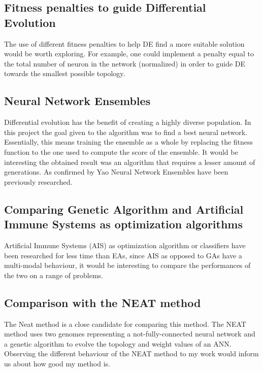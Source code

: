 \documentclass[a4paper,12pt, oneside]{memoir}
\begin{document}
\subsection{Fitness penalties to guide Differential Evolution}

The use of different fitness penalties to help DE find a more suitable solution would be worth exploring. For example, one could implement a penalty equal to the total number of neuron in the network (normalized) in order to guide DE towards the smallest possible topology.

\subsection{Neural Network Ensembles}

Differential evolution has the benefit of creating a highly diverse population. In this project the goal given to the algorithm was to find a best neural network. Essentially, this means training the ensemble as a whole by replacing the fitness function to the one used to compute the score of the ensemble. It would be interesting the obtained result was an algorithm that requires a lesser amount of generations. As confirmed by Yao \cite{yao-1999} Neural Network Ensembles have been previously researched.

\subsection{Comparing Genetic Algorithm and Artificial Immune Systems as optimization algorithms}

Artificial Immune Systems (AIS) as optimization algorithm or classifiers have been researched for less time than EAs, since AIS as opposed to GAs have a multi-modal behaviour, it would be interesting to compare the performances of the two on a range of problems.

\subsection{Comparison with the NEAT method}

The Neat method \cite{stanley-2002} is a close candidate for comparing this method. The NEAT method uses two genomes representing a not-fully-connected neural network and a genetic algorithm to evolve the topology and weight values of an ANN. Observing the different behaviour of the NEAT method to my work would inform us about how good my method is. 
\end{document}
